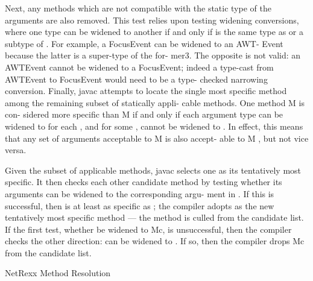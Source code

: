 Next, any methods which are not compatible with the static type of the arguments are also removed. This test relies upon testing widening conversions, where one type can be widened to another if and only if is the same type as or a subtype of . For example, a FocusEvent can be widened to an AWT- Event because the latter is a super-type of the for- mer3. The opposite is not valid: an AWTEvent cannot be widened to a FocusEvent; indeed a type-cast from AWTEvent to FocusEvent would need to be a type- checked narrowing conversion.
Finally, javac attempts to locate the single most specific method among the remaining subset of statically appli- cable methods. One method M is con- sidered more specific than M if and only if each argument type can be widened to for each , and for some , cannot be widened to . In effect, this means that any set of arguments acceptable to M is also accept- able to M , but not vice versa.

Given the subset of applicable methods, javac selects one as its tentatively most specific. It then checks each other candidate method by testing whether its arguments can be widened to the corresponding argu- ment in . If this is successful, then is at least as specific as ; the compiler adopts as the new tentatively most specific method — the method is culled from the candidate list. If the first test, whether be widened to Mc, is unsuccessful, then the compiler checks the other direction: can be widened to . If so, then the compiler drops Mc from the candidate list.

NetRexx Method Resolution

